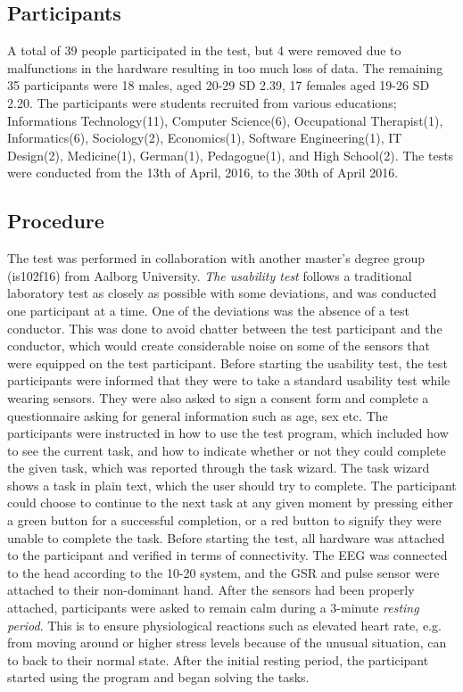 \subsection{Participants}
A total of 39 people participated in the test, but 4 were removed due to malfunctions in the hardware resulting in too much loss of data. 
The remaining 35 participants were 18 males, aged 20-29 SD 2.39, 17 females aged 19-26 SD 2.20.
The participants were students recruited from various educations; Informations Technology(11), Computer Science(6), Occupational Therapist(1), Informatics(6), Sociology(2), Economics(1), Software Engineering(1), IT Design(2), Medicine(1), German(1), Pedagogue(1), and High School(2).
The tests were conducted from the 13th of April, 2016, to the 30th of April 2016. 

\subsection{Procedure}
The test was performed in collaboration with another master's degree group (is102f16) from Aalborg University.
\textit{The usability test} follows a traditional laboratory test as closely as possible with some deviations, and was conducted one participant at a time. 
One of the deviations was the absence of a test conductor. This was done to avoid chatter between the test participant and the conductor, which would create considerable noise on some of the sensors that were equipped on the test participant.
Before starting the usability test, the test participants were informed that they were to take a standard usability test while wearing sensors.
They were also asked to sign a consent form and complete a questionnaire asking for general information such as age, sex etc.  
The participants were instructed in how to use the test program, which included how to see the current task, and how to indicate whether or not they could complete the given task, which was reported through the task wizard. 
The task wizard shows a task in plain text, which the user should try to complete. The participant could choose to continue to the next task at any given moment by pressing either a green button for a successful completion, or a red button to signify they were unable to complete the task. 
Before starting the test, all hardware was attached to the participant and verified in terms of connectivity. 
The EEG was connected to the head according to the 10-20 system\cite{eeg_tech_10_20}, and the GSR and pulse sensor were attached to their non-dominant hand.
After the sensors had been properly attached, participants were asked to remain calm during a 3-minute \textit{resting period}. 
This is to ensure physiological reactions such as elevated heart rate, e.g. from moving around or higher stress levels because of the unusual situation, can to back to their normal state. 
After the initial resting period, the participant started using the program and began solving the tasks. 

